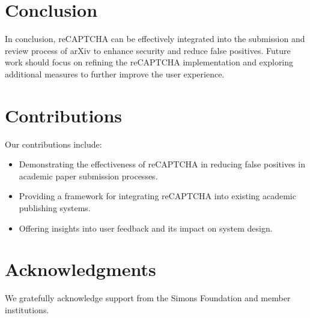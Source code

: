 \documentclass{article}
\begin{document}
\section{Conclusion}
\label{sec:conclusion}
In conclusion, reCAPTCHA can be effectively integrated into the submission and review process of arXiv to enhance security and reduce false positives. Future work should focus on refining the reCAPTCHA implementation and exploring additional measures to further improve the user experience.

\section{Contributions}
\label{sec:contributions}
Our contributions include:
\begin{itemize}
    \item Demonstrating the effectiveness of reCAPTCHA in reducing false positives in academic paper submission processes.
    \item Providing a framework for integrating reCAPTCHA into existing academic publishing systems.
    \item Offering insights into user feedback and its impact on system design.
\end{itemize}

\section*{Acknowledgments}
We gratefully acknowledge support from the Simons Foundation and member institutions.



\end{document}
